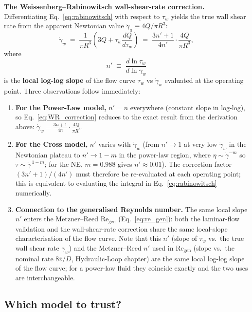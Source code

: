 \documentclass[11pt,a4paper]{article}
\newcommand{\gd}{\dot{\gamma}}
\newcommand{\Rey}{\mathrm{Re}}
\begin{document}
\textbf{The Weissenberg--Rabinowitsch wall-shear-rate correction.}
Differentiating Eq.~\eqref{eq:rabinowitsch} with respect to $\tau_w$
yields the true wall shear rate from the apparent Newtonian value
$\gd_a\equiv 4Q/\pi R^3$:
\begin{equation}
\gd_w \;=\; \frac{1}{\pi R^3}
            \left(3Q + \tau_w\frac{dQ}{d\tau_w}\right)
     \;=\; \frac{3n'+1}{4n'}\cdot\frac{4Q}{\pi R^3},
\label{eq:WR_correction}
\end{equation}
where
\begin{equation}
n' \;\equiv\; \frac{d\ln\tau_w}{d\ln\gd_w}
\label{eq:nprime}
\end{equation}
is the \textbf{local log-log slope} of the flow curve $\tau_w$ vs
$\gd_w$ evaluated at the operating point. Three observations follow
immediately:
\begin{enumerate}[leftmargin=1.6em,itemsep=2pt]
\item \textbf{For the Power-Law model,} $n'=n$ everywhere (constant
  slope in log-log), so
  Eq.~\eqref{eq:WR_correction} reduces to the exact result from the
  derivation above: $\gd_w=\frac{3n+1}{4n}\cdot\frac{4Q}{\pi R^3}$.
\item \textbf{For the Cross model,} $n'$ varies with $\gd_w$
  (from $n'\to 1$ at very low $\gd_w$ in the Newtonian plateau to
  $n'\to 1-m$ in the power-law region, where $\eta\sim\gd^{-m}$ so
  $\tau\sim\gd^{\,1-m}$; for the NE, $m=0.988$ gives $n'\approx0.01$).
  The correction factor $(3n'+1)/(4n')$ must therefore be re-evaluated
  at each operating point; this is equivalent to evaluating the integral
  in Eq.~\eqref{eq:rabinowitsch} numerically.
\item \textbf{Connection to the generalised Reynolds number.}
  The same local slope $n'$ enters the Metzner--Reed
  $\Rey_\mathrm{gen}$ (Eq.~\ref{eq:re_gen}): both the laminar-flow
  validation and the wall-shear-rate correction share the same
  local-slope characterisation of the flow curve.
  Note that this $n'$ (slope of $\tau_w$ vs.\ the true wall shear rate
  $\gd_w$) and the Metzner--Reed $n'$ used in $\Rey_\mathrm{gen}$ (slope
  vs.\ the nominal rate $8\bar{v}/D$, Hydraulic-Loop chapter) are the
  same local log-log slope of the flow curve; for a power-law fluid
  they coincide exactly and the two uses are interchangeable.
\end{enumerate}

\subsection{Which model to trust?}
\end{document}
